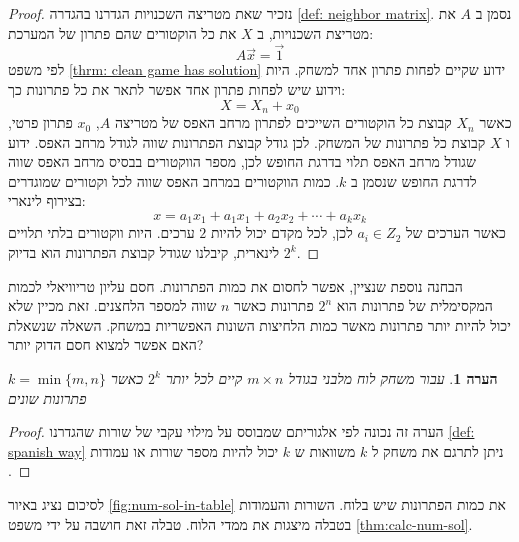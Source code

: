 \documentclass[12pt,leqno]{article}
\theoremstyle{theoremdd}
\newtheorem{comm}{הערה}[section]
\begin{document}
\begin{proof}
    נזכיר שאת מטריצה השכנויות הגדרנו בהגדרה
    \ref{def: neighbor matrix}.
    נסמן ב
    $A$
    את מטריצת השכנויות,
    ב
    $X$
    את כל הוקטורים שהם פתרון של המערכת:
    \[A \vec x = \vec{1}\]
    לפי משפט 
    \ref{thrm: clean game has solution}
    ידוע שקיים לפחות פתרון אחד למשחק.
    היות וידוע שיש לפחות פתרון אחד אפשר לתאר את כל פתרונות כך:
    \[X = X_n + x_0\]
    כאשר 
    $X_n$
    קבוצת כל הוקטורים השייכים לפתרון מרחב האפס 
    של מטריצה 
    $A$,
    $x_0$ 
    פתרון פרטי,  
    ו
    $X$
    קבוצת
    כל פתרונות של המשחק.
    לכן גודל קבוצת הפתרונות שווה לגודל מרחב האפס.
    ידוע שגודל מרחב האפס תלוי בדרגת החופש לכן, מספר הווקטורים בבסיס
    מרחב האפס שווה לדרגת החופש שנסמן ב
    $k$.
    כמות הווקטורים במרחב האפס שווה לכל וקטורים שמוגדרים בצירוף לינארי:
    \[x = a_1 x_1 + a_1 x_1 + a_2 x_2 + \cdots + a_k x_k\]
    כאשר הערכים של
    $a_i \in Z_2$
    לכן,
    לכל מקדם יכול להיות
    $2$
    ערכים.
    היות ווקטורים בלתי תלויים לינארית,
    קיבלנו שגודל קבוצת הפתרונות הוא בדיוק
    $2^k$.
\end{proof}
הבחנה נוספת שנציין, אפשר לחסום את כמות הפתרונות.
חסם עליון טריוויאלי לכמות המקסימלית של פתרונות הוא 
$2^n$
פתרונות כאשר
$n$
שווה למספר הלחצנים.
זאת מכיין שלא יכול להיות יותר פתרונות מאשר כמות הלחיצות השונות האפשריות במשחק.
השאלה שנשאלת האם אפשר למצוא חסם הדוק יותר?
\begin{comm}
    עבור משחק לוח מלבני
    בגודל 
    $m \times n$
    קיים לכל יותר 
    $2^k$
    כאשר 
    $k = \min\{m,n\}$
    פתרונות שונים
\end{comm}
\begin{proof}
    הערה זה נכונה לפי אלגוריתם שמבוסס על מילוי עקבי של שורות
שהגדרנו
\ref{def: spanish way}
ניתן לתרגם את משחק ל
$k$
משוואות 
ש
$k$
יכול להיות מספר שורות או עמודות 
.
\end{proof}
לסיכום 
נציג באיור 
\ref{fig:num-sol-in-table}
את כמות הפתרונות שיש בלוח.
השורות והעמודות בטבלה מיצגות את ממדי הלוח.
טבלה זאת חושבה על ידי משפט 
\ref{thm:calc-num-sol}.
\end{document}
